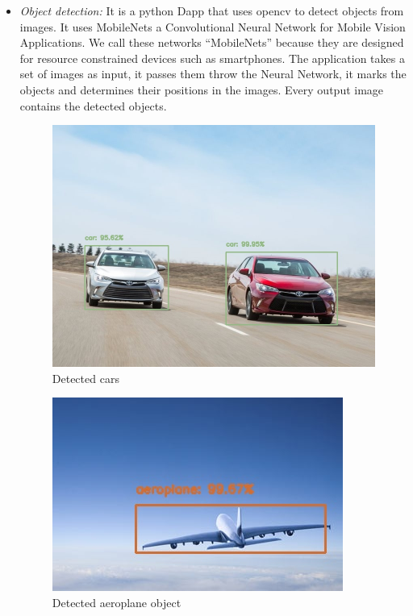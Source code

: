     \begin{itemize}
        \item \textit{Object detection: }
        It is a python Dapp that uses opencv to detect objects from images. It uses
        MobileNets\cite{mobile-nets} a Convolutional Neural Network for Mobile Vision Applications.
        We call these networks “MobileNets” because they are designed for resource constrained
        devices such as smartphones.
        The application takes a set of images as input, it passes them throw the
        Neural Network, it marks the objects and determines their positions in the images.
        Every output image contains the detected objects.

        \clearpage

        \begin{figure}[!h]\centering
            \includegraphics[width=.6\columnwidth]{6-Implementation/figs/object-detector-exp-1.jpg}
            \caption{Detected cars}
        \end{figure}

        \vspace{50px}

        \begin{figure}[!h]\centering
            \includegraphics[width=.6\columnwidth]{6-Implementation/figs/object-detector-exp-2.jpg}
            \caption{Detected aeroplane object}
        \end{figure}


\end{itemize}
